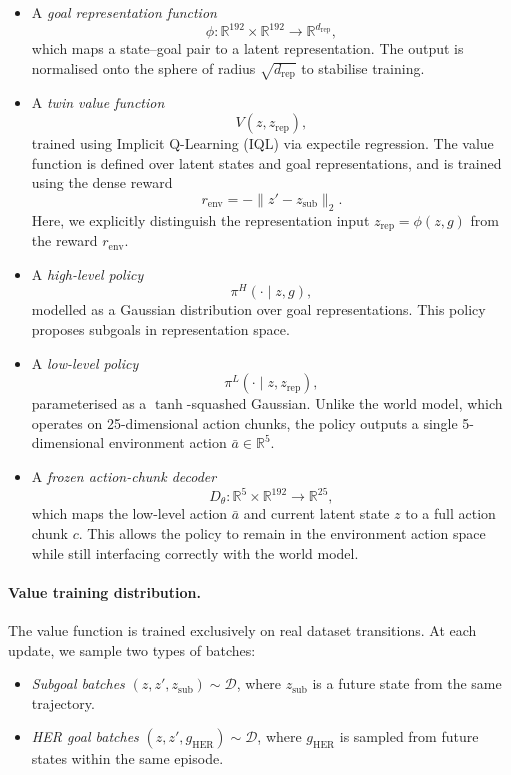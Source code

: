 \begin{itemize}
\item A \emph{goal representation function}
\[
\phi : \mathbb{R}^{192} \times \mathbb{R}^{192} \to \mathbb{R}^{d_{\mathrm{rep}}},
\]
which maps a state--goal pair to a latent representation. The output is
normalised onto the sphere of radius $\sqrt{d_{\mathrm{rep}}}$ to
stabilise training.

\item A \emph{twin value function}
\[
V(z, z_{\mathrm{rep}}),
\]
trained using Implicit Q-Learning (IQL) via expectile regression. The
value function is defined over latent states and goal representations,
and is trained using the dense reward
\[
r_{\mathrm{env}} = -\|z' - z_{\mathrm{sub}}\|_2.
\]
Here, we explicitly distinguish the representation input
$z_{\mathrm{rep}} = \phi(z, g)$ from the reward $r_{\mathrm{env}}$.

\item A \emph{high-level policy}
\[
\pi^H(\cdot \mid z, g),
\]
modelled as a Gaussian distribution over goal representations. This
policy proposes subgoals in representation space.

\item A \emph{low-level policy}
\[
\pi^L(\cdot \mid z, z_{\mathrm{rep}}),
\]
parameterised as a $\tanh$-squashed Gaussian. Unlike the world model,
which operates on 25-dimensional action chunks, the policy outputs a
single 5-dimensional environment action $\bar{a} \in \mathbb{R}^5$.

\item A \emph{frozen action-chunk decoder}
\[
D_\theta : \mathbb{R}^5 \times \mathbb{R}^{192} \to \mathbb{R}^{25},
\]
which maps the low-level action $\bar{a}$ and current latent state $z$
to a full action chunk $c$. This allows the policy to remain in the
environment action space while still interfacing correctly with the
world model.
\end{itemize}

\paragraph{Value training distribution.}
The value function is trained exclusively on real dataset transitions.
At each update, we sample two types of batches:
\begin{itemize}
\item \emph{Subgoal batches} $(z, z', z_{\mathrm{sub}}) \sim \mathcal{D}$,
where $z_{\mathrm{sub}}$ is a future state from the same trajectory.
\item \emph{HER goal batches} $(z, z', g_{\mathrm{HER}}) \sim \mathcal{D}$,
where $g_{\mathrm{HER}}$ is sampled from future states within the same
episode.
\end{itemize}

